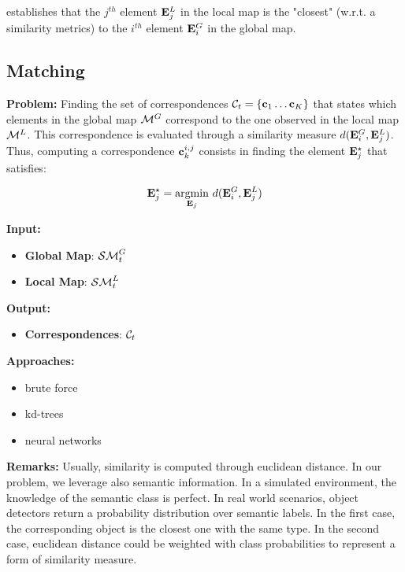 \documentclass{article}
\begin{document}
	\noindent
	establishes that the $j^{th}$ element $\mathbf{E}_j^L$ in the local map is the "closest" (w.r.t. a similarity metrics) to the $i^{th}$ element $\mathbf{E}_i^G$ in the global map.
	
	\subsection{Matching} 
	
	{\bf Problem: }	Finding the set of correspondences $\mathcal{C}_t = \{\mathbf{c}_1 \dots \mathbf{c}_K\}$ that states which elements in the global map $\mathcal{M}^G$ correspond to the one observed in the local map $\mathcal{M}^L$. This correspondence is evaluated through a similarity measure $d(\mathbf{E}_i^G,\mathbf{E}_j^L)$. Thus, computing a correspondence $\mathbf{c}^{i,j}_k$ consists in finding the element $\mathbf{E}_j^\star$ that satisfies:
	
	\begin{equation}
		\mathbf{E}_j^\star = \operatorname*{argmin}_{\mathbf{E}_j} \, d(\mathbf{E}_i^G,\mathbf{E}_j^L)
	\end{equation}
		
	\noindent
	{\bf Input: }
	\begin{itemize}
		\item {\bf Global Map}: $\mathcal{SM}^G_t$
		\item {\bf Local Map}: $\mathcal{SM}^L_t$
	\end{itemize}
	\noindent
	{\bf Output: }
	\begin{itemize}
		\item {\bf Correspondences}: $\mathcal{C}_t$		
	\end{itemize}
	\noindent
	{\bf Approaches: }
	\begin{itemize}
		\item brute force
		\item kd-trees
		\item neural networks
	\end{itemize}
	\noindent
	{\bf Remarks: }
	Usually, similarity is computed through euclidean distance. In our problem, we leverage also semantic information. In a simulated environment, the knowledge of the semantic class is perfect. In real world scenarios, object detectors return a probability distribution over semantic labels. In the first case, the corresponding object is the closest one with the same type. In the second case, euclidean distance could be weighted with class probabilities to represent a form of similarity measure.
		
\end{document}
